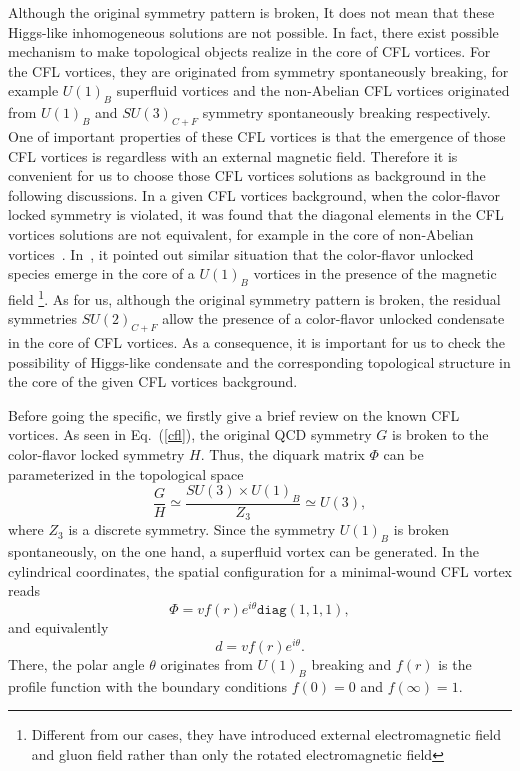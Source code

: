 \documentclass[12pt]{article}
\begin{document}
Although the original symmetry pattern  is broken,
It does not mean that these Higgs-like inhomogeneous solutions are not possible.
In fact, there exist possible mechanism to  make
 topological objects realize in the core of CFL vortices. 
For the CFL vortices, they are originated from symmetry spontaneously breaking, 
for example  $U(1)_B$ superfluid vortices and the non-Abelian CFL vortices
originated from $U(1)_B$ 
and $SU(3)_{C+F}$ symmetry spontaneously breaking respectively.
One of important properties of these CFL vortices is that
the emergence of those CFL vortices is regardless with an external magnetic field.
Therefore it is convenient for us to choose
those CFL vortices solutions as background in the following discussions.
In a given CFL vortices background, when the color-flavor locked symmetry is violated,
it was found that
the diagonal elements in the CFL vortices solutions are not equivalent, 
for example in the core of
non-Abelian vortices~\cite{balachandran2006semisuperfluid,nakano2008non,eto2009color}.
In~\cite{iida2005magnetic}, it  pointed out similar situation that the color-flavor
unlocked species  emerge in the core of a $U(1)_B$ vortices in the presence of the magnetic field
\footnote{Different from our cases, they have introduced external electromagnetic field and
gluon field rather than only the rotated electromagnetic field}.
As for us, although the original symmetry pattern is broken, the residual symmetries $SU(2)_{C+F}$
allow the presence of a color-flavor unlocked condensate in the core of
CFL vortices.
As a consequence,
it is important for us to check the possibility of Higgs-like condensate and the corresponding
topological structure in the core of the given CFL vortices background.

Before going the specific, we firstly give a brief review on the known CFL vortices.
As seen in Eq.~(\ref{cfl}), the original QCD symmetry $G$ is broken to
the color-flavor locked symmetry $H$.
Thus, the diquark matrix $\Phi$ can be parameterized in the
topological space
\begin{equation}
  \label{eq:cflvortexgroup}
  \frac{G}{H} \simeq \frac{SU(3) \times U(1)_B}{Z_3}  \simeq U(3),
\end{equation}
where $Z_3$ is a discrete symmetry.
Since the symmetry $U(1)_B$ is broken spontaneously, on the one hand, a superfluid vortex can be generated.
In the cylindrical coordinates, the spatial configuration for a minimal-wound CFL vortex reads
\begin{equation}
  \label{eq:bvortexphi}
\Phi =vf(r)e^{i \theta} \texttt{diag}(1,1,1),
\end{equation}
and equivalently
\begin{equation}
 d = vf(r)e^{i\theta}. \label{eq:bvortex}\end{equation}
There, the polar angle $\theta$ originates from $U(1)_B$ breaking and
$f(r)$ is the profile function with the boundary
conditions $f(0) = 0$ and $f(\infty) =1$.
\end{document}
